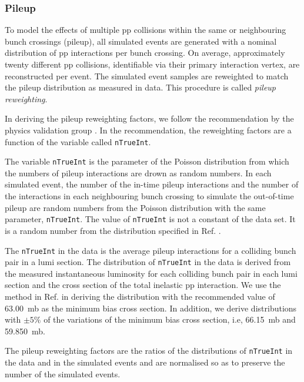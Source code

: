 \subsubsection{Pileup}
\label{sec:pileup-reweighting}

To model the effects of multiple pp collisions within the same or
neighbouring bunch crossings (pileup), all simulated events are
generated with a nominal distribution of pp interactions per bunch
crossing. On average, approximately twenty different pp collisions,
identifiable via their primary interaction vertex, are reconstructed
per event. The simulated event samples are reweighted to match the
pileup distribution as measured in data. This procedure is called
\textit{pileup reweighting}.

In deriving the pileup reweighting factors, we follow the
recommendation by the physics validation group
\cite{twiki-PdmVPileUpDescription, twiki-PileupJSONFileforData}. In
the recommendation, the reweighting factors are a function of the
variable called \verb!nTrueInt!.

The variable \verb!nTrueInt! is the parameter of the Poisson
distribution from which the numbers of pileup interactions are drown
as random numbers. In each simulated event, the number of the in-time
pileup interactions and the number of the interactions in each
neighbouring bunch crossing to simulate the out-of-time pileup are
random numbers from the Poisson distribution with the same parameter,
\verb!nTrueInt!. The value of \verb!nTrueInt! is not a constant of the
data set. It is a random number from the distribution specified in
Ref. \cite{github-mix_2016_25ns_SpringMC_PUScenarioV1_PoissonOOTPU_cfi}.

The \verb!nTrueInt! in the data is the average pileup interactions for
a colliding bunch pair in a lumi section. The distribution of
\verb!nTrueInt! in the data is derived from the measured instantaneous
luminosity for each colliding bunch pair in each lumi section and the
cross section of the total inelastic pp interaction. We use the method
in Ref. \cite{twiki-PileupJSONFileforData} in deriving the
distribution with the recommended value of 63.00~mb as the minimum
bias cross section. In addition, we derive distributions with $\pm
5\%$ of the variations of the minimum bias cross section, i.e,
66.15~mb and 59.850~mb.

The pileup reweighting factors are the ratios of the distributions of
\verb!nTrueInt! in the data and in the simulated events and are
normalised so as to preserve the number of the simulated events.

